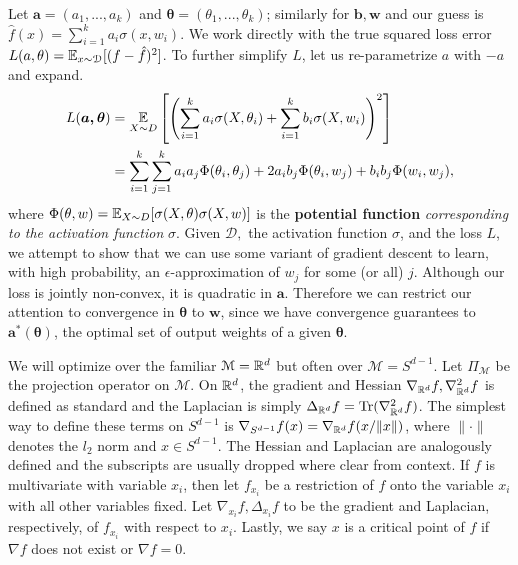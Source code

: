 Let $\boldsymbol{a} = (a_1,...,a_k)$ and $\boldsymbol{\theta} = (\theta_1,...,\theta_k)$; similarly for $\boldsymbol{b}, \boldsymbol{w}$ and our guess is $\hat{f}(x) = \sum_{i=1}^k a_i \sigma(x, w_i)$. We work directly with the true squared loss error $L(a,\theta)= \operatorname*{\mathbb{E}}_{x \sim \mathcal{D}}[(f - \hat{f})^2]$. To further simplify $L$, let us
re-parametrize $a$ with $-a$ and expand.
%
%
\begin{align}
 L(\boldsymbol{a,\theta})  & = \expt_{X\sim D}\left[ \left(
  \sum_{i=1}^k a_i \sigma(X,\theta_i) + \sum_{i=1}^k
  b_i\sigma(X,w_i)\right)^2\right] \nonumber \\
%
& = \sum_{i=1}^k \sum_{j=1}^k a_i a_j \Phi(\theta_i,\theta_j)+ 2 a_ib_j \Phi(\theta_i,w_j)+ b_i b_j \Phi(w_i,w_j),
 \label{errLoss}
\end{align}
%
where $\Phi(\theta, w) = \operatorname*{\mathbb{E}}_{X\sim D}[ \sigma(X,\theta) \sigma(X,w)]$ is
the {\bf potential function} {\it corresponding to the activation function} $\sigma$. Given $\mathcal{D},$ the activation function $\sigma$, and the loss $L$, we attempt to show that we can use some variant of gradient descent to learn, with high probability, an $\epsilon$-approximation of $w_j$ for some (or all) $j$. Although our loss is jointly non-convex, it is quadratic in $\boldsymbol{a}$. Therefore we can restrict our attention to convergence in $\boldsymbol{\theta}$ to $\boldsymbol{w}$, since we have convergence guarantees to $\boldsymbol{a^*(\theta)}$, the optimal set of output weights of a given $\boldsymbol{\theta}$. 

We will optimize over the familiar $\mathcal{M}= {\mathbb{R}}^d$ {\color{red}but often over $\mathcal{M} = S^{d-1}$}. Let $\Pi_\mathcal{M}$ be the projection operator on $\mathcal{M}$. On ${\mathbb{R}}^d$, the gradient and Hessian $\nabla_{{\mathbb{R}}^d} f, \nabla_{{\mathbb{R}}^d}^2 f$ is defined as standard and the Laplacian is simply $\Delta_{{\mathbb{R}}^d} f = \operatorname{Tr}(\nabla_{{\mathbb{R}}^d}^2 f)$. The simplest way to define these terms on $S^{d-1}$ is $\nabla_{S^{d-1}} f(x) = \nabla_{{\mathbb{R}}^d} f(x/\|x\|)$, where $\| \cdot \|$ denotes the $l_2$ norm and $x \in S^{d-1}$. The Hessian and Laplacian are analogously defined and the subscripts are usually dropped where clear from context. If $f$ is multivariate with variable $x_i$, then let $f_{x_i}$ be a
restriction of $f$ onto the variable $x_i$ with all other variables
fixed. Let $\nabla_{x_i}f, \Delta_{x_i}f$ to be the gradient and
Laplacian, respectively, of $f_{x_i}$ with respect to
$x_i$. Lastly, we say $x$ is a critical point of $f$ if $\nabla f$
does not exist or $\nabla f = 0$.




